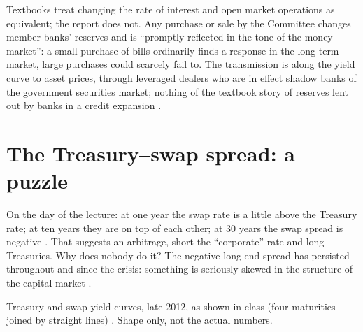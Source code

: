 \begin{paracol}{2}
\begin{intuition}
Textbooks treat changing the rate of interest and open market operations as equivalent; the report does not. Any purchase or sale by the Committee changes
member banks' reserves and is ``promptly reflected in the tone of the money market'': a small purchase of bills ordinarily finds a response in the long-term
market, large purchases could scarcely fail to. The transmission is along the yield curve to asset prices, through leveraged dealers who are in effect shadow
banks of the government securities market; nothing of the textbook story of reserves lent out by banks in a credit expansion .
\end{intuition}

\section{The Treasury--swap spread: a puzzle}\label{sec:irs-puzzle}

On the day of the lecture: at one year the swap rate is a little above the Treasury rate; at ten years they are on top of each other; at 30 years the swap spread is
negative . That suggests an arbitrage, short the ``corporate'' rate and long Treasuries. Why does nobody do it? The
negative long-end spread has persisted throughout and since the crisis: something is seriously skewed in the structure of the capital market
.

\begin{nfigure}
\caption{Treasury and swap yield curves, late 2012, as shown in class (four maturities joined by straight lines) . Shape only, not the actual numbers.}\label{fig:irs-curves}
\end{nfigure}


\end{paracol}
